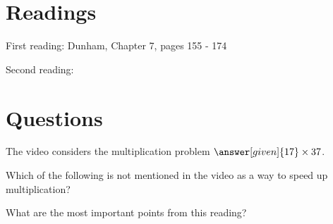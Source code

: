 \documentclass[nooutcomes]{ximera}
\begin{document}
\section{Readings}
First reading: Dunham, Chapter 7, pages 155 - 174

Second reading: 



\section{Questions}

\begin{question}
The video considers the multiplication problem $\answer[given]{17} \times 37$.
\end{question}

\begin{question}
Which of the following is not mentioned in the video as a way to speed up multiplication?
\begin{multipleChoice}
\end{multipleChoice}
\end{question}


\begin{question}
What are the most important points from this reading?
\begin{freeResponse}
\end{freeResponse}

\end{question}
\end{document}
